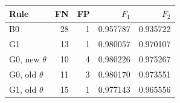 \begin{tabular}{lrrrr}
\toprule
Rule & FN & FP & $F_1$ & $F_2$ \\
\midrule
B0 & 28 & 1 & 0.957787 & 0.935722 \\
G1 & 13 & 1 & 0.980057 & 0.970107 \\
G0, new $\theta$ & 10 & 4 & 0.980226 & 0.975267 \\
G0, old $\theta$ & 11 & 3 & 0.980170 & 0.973551 \\
G1, old $\theta$ & 15 & 1 & 0.977143 & 0.965556 \\
\bottomrule
\end{tabular}
